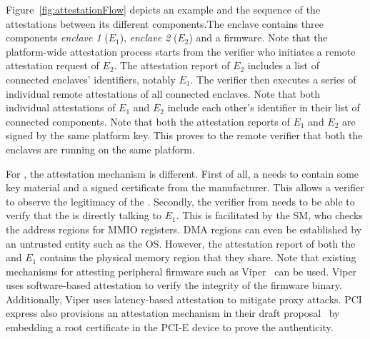 
Figure~\ref{fig:attestationFlow} depicts an example \nameenclave{} and the sequence of the attestations between its different components.The \name enclave contains three components \emph{enclave 1} ($E_1$), \emph{enclave 2} ($E_2$) and a \sphw firmware. Note that the platform-wide attestation process starts from the verifier who initiates a remote attestation request of $E_2$. 
The attestation report of $E_2$ includes a list  of connected enclaves' identifiers, notably $E_1$. The verifier then executes a series of individual remote attestations of all connected enclaves. Note that both individual attestations of $E_1$ and $E_2$ include each other's identifier in their list of connected components. Note that both the attestation reports of $E_1$ and $E_2$ are signed by the same platform key. This proves to the remote verifier that both the enclaves are running on the same platform.

For \sphw, the attestation mechanism is different. First of all, a \sphw needs to contain some key material and a signed certificate from the manufacturer. This allows a verifier to observe the legitimacy of the \sphw. Secondly, the verifier from  needs to be able to verify that the \sphw is directly talking to $E_1$. This is facilitated by the SM, who checks the address regions for MMIO registers. DMA regions can even be established by an untrusted entity such as the OS. However, the attestation report of both the \sphw and $E_1$ contains the physical memory region that they share. Note that existing mechanisms for attesting peripheral firmware such as Viper~\cite{li2011viper} can be used. Viper uses software-based attestation to verify the integrity of the firmware binary. Additionally, Viper uses latency-based attestation to mitigate proxy attacks. PCI express also provisions an attestation mechanism in their draft proposal~\cite{pcie_attest} by embedding a root certificate in the PCI-E device to prove the authenticity. 

